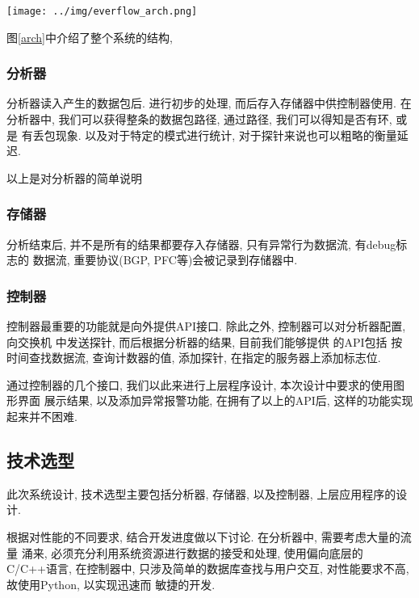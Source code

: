 {\begin{mdframed}[everyline=true]
\begin{center}
    \texttt{[image: ../img/everflow\_arch.png]}
    \label{arch}
\end{center}

图\ref{arch}中介绍了整个系统的结构,

\subsubsection{分析器}

  分析器读入产生的数据包后. 进行初步的处理, 而后存入存储器中供控制器使用.
在分析器中, 我们可以获得整条的数据包路径, 通过路径,
我们可以得知是否有环, 或是 有丢包现象. 以及对于特定的模式进行统计,
对于探针来说也可以粗略的衡量延迟.

  以上是对分析器的简单说明


\subsubsection{存储器}

分析结束后, 并不是所有的结果都要存入存储器, 只有异常行为数据流,
有debug标志的 数据流, 重要协议(BGP, PFC等)会被记录到存储器中.

\subsubsection{控制器}

控制器最重要的功能就是向外提供API接口. 除此之外, 控制器可以对分析器配置,
向交换机 中发送探针, 而后根据分析器的结果, 目前我们能够提供 的API包括
按时间查找数据流, 查询计数器的值, 添加探针, 在指定的服务器上添加标志位.

通过控制器的几个接口, 我们以此来进行上层程序设计,
本次设计中要求的使用图形界面 展示结果, 以及添加异常报警功能,
在拥有了以上的API后, 这样的功能实现起来并不困难.


\subsection{技术选型}

此次系统设计, 技术选型主要包括分析器, 存储器, 以及控制器, 上层应用程序的设计.


根据对性能的不同要求, 结合开发进度做以下讨论. 在分析器中, 需要考虑大量的流量
涌来, 必须充分利用系统资源进行数据的接受和处理, 使用偏向底层的C/C++语言, 在控制器中,
只涉及简单的数据库查找与用户交互, 对性能要求不高, 故使用Python, 以实现迅速而
敏捷的开发.


\end{mdframed}}
